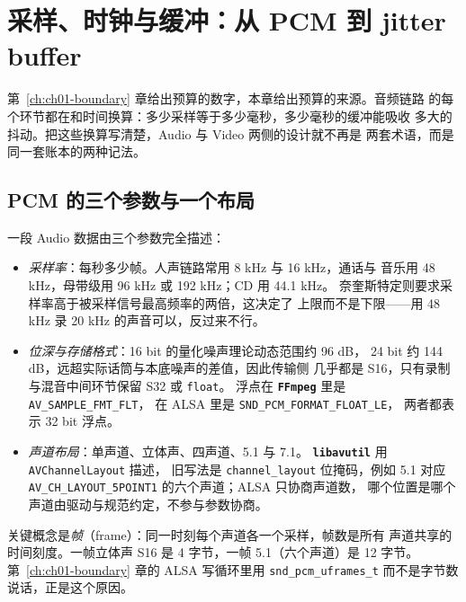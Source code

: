 \documentclass[12pt,a4paper,fontset=fandol]{ctexbook}
\newcommand{\Tp}[1]{\texttt{#1}}
\newcommand{\Lib}[1]{\textbf{\texttt{#1}}}
\newcommand{\Lang}[1]{\textsf{#1}}
\newcommand{\DomAud}{\Lang{Audio}}
\newcommand{\DomVid}{\Lang{Video}}
\begin{document}
\chapter{采样、时钟与缓冲：从 PCM 到 jitter buffer}
\label{ch:ch02-clock-buffer}

第~\ref{ch:ch01-boundary} 章给出预算的数字，本章给出预算的来源。音频链路
的每个环节都在和时间换算：多少采样等于多少毫秒，多少毫秒的缓冲能吸收
多大的抖动。把这些换算写清楚，\DomAud{} 与 \DomVid{} 两侧的设计就不再是
两套术语，而是同一套账本的两种记法。

\section{PCM 的三个参数与一个布局}
\label{sec:ch02-pcm}

一段 \DomAud{} 数据由三个参数完全描述：

\begin{itemize}
  \item \emph{采样率}：每秒多少帧。人声链路常用 8 kHz 与 16 kHz，通话与
        音乐用 48 kHz，母带级用 96 kHz 或 192 kHz；\Lang{CD}{} 用 44.1 kHz。
        奈奎斯特定则要求采样率高于被采样信号最高频率的两倍，这决定了
        上限而不是下限——用 48 kHz 录 20 kHz 的声音可以，反过来不行。
  \item \emph{位深与存储格式}：16 bit 的量化噪声理论动态范围约 96 dB，
        24 bit 约 144 dB，远超实际话筒与本底噪声的差值，因此传输侧
        几乎都是 S16，只有录制与混音中间环节保留 S32 或 \Tp{float}。
        浮点在 \Lib{FFmpeg}{} 里是 \Tp{AV\_SAMPLE\_FMT\_FLT}，
        在 ALSA 里是 \Tp{SND\_PCM\_FORMAT\_FLOAT\_LE}，
        两者都表示 32 bit 浮点。
  \item \emph{声道布局}：单声道、立体声、四声道、5.1 与 7.1。
        \Lib{libavutil}{} 用 \Tp{AVChannelLayout} 描述，
        旧写法是 \Tp{channel\_layout} 位掩码，例如 5.1 对应
        \Tp{AV\_CH\_LAYOUT\_5POINT1} 的六个声道；ALSA 只协商声道数，
        哪个位置是哪个声道由驱动与规范约定，不参与参数协商。
\end{itemize}

关键概念是\emph{帧}（frame）：同一时刻每个声道各一个采样，帧数是所有
声道共享的时间刻度。一帧立体声 S16 是 4 字节，一帧 5.1（六个声道）是
12 字节。第~\ref{ch:ch01-boundary} 章的 ALSA 写循环里用
\Tp{snd\_pcm\_uframes\_t} 而不是字节数说话，正是这个原因。
\end{document}
